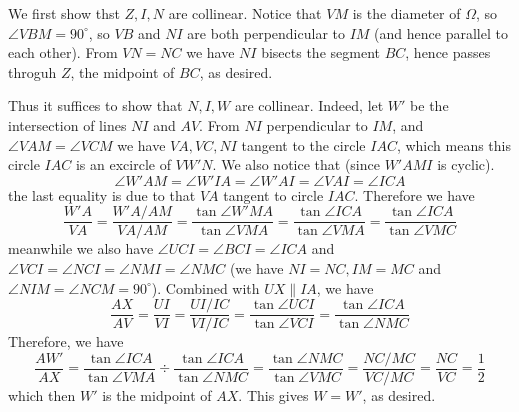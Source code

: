 \documentclass[11pt,a4paper]{article}
\begin{document}
\begin{enumerate}
	We first show thst $Z, I, N$ are collinear. Notice that $VM$ is the diameter of $\Omega$, so $\angle VBM=90^{\circ}$, so $VB$ and $NI$ are both perpendicular to $IM$ (and hence parallel to each other). 
	From $VN=NC$ we have $NI$ bisects the segment $BC$, hence passes throguh $Z$, the midpoint of $BC$, as desired. 
	
	Thus it suffices to show that $N, I, W$ are collinear. Indeed, let $W'$ be the intersection of lines $NI$ and $AV$. From $NI$ perpendicular to $IM$, and $\angle VAM=\angle VCM$ we have $VA, VC, NI$ tangent to the circle $IAC$, which means this circle $IAC$ is an excircle of $VW'N$. We also notice that (since $W'AMI$ is cyclic). 
	\[
	\angle W'AM = \angle W'IA=\angle W'AI=\angle VAI = \angle ICA
	\]
	the last equality is due to that $VA$ tangent to circle $IAC$. Therefore we have 
	\[
	\frac{W'A}{VA}=\frac{W'A/AM}{VA/AM}=\frac{\tan\angle W'MA}{\tan\angle VMA}=\frac{\tan\angle ICA}{\tan\angle VMA}=\frac{\tan\angle ICA}{\tan\angle VMC}
	\]
	meanwhile we also have $\angle UCI=\angle BCI=\angle ICA$ and $\angle VCI=\angle NCI=\angle NMI=\angle NMC$ (we have $NI=NC, IM=MC$ and $\angle NIM=\angle NCM=90^{\circ}$). 
	Combined with $UX\parallel IA$, we have 
	\[
	\frac{AX}{AV}=\frac{UI}{VI}=\frac{UI/IC}{VI/IC} = \frac{\tan\angle UCI}{\tan\angle VCI} = \frac{\tan\angle ICA}{\tan\angle NMC}
	\]
	Therefore, we have 
	\[
	\frac{AW'}{AX}=\frac{\tan\angle ICA}{\tan\angle VMA}\div \frac{\tan\angle ICA}{\tan\angle NMC} = \frac{\tan\angle NMC}{\tan\angle VMC}=\frac{NC/MC}{VC/MC}=\frac{NC}{VC}=\frac 12
	\]
	which then $W'$ is the midpoint of $AX$. This gives $W=W'$, as desired. 
	
\end{enumerate}
\end{document}

